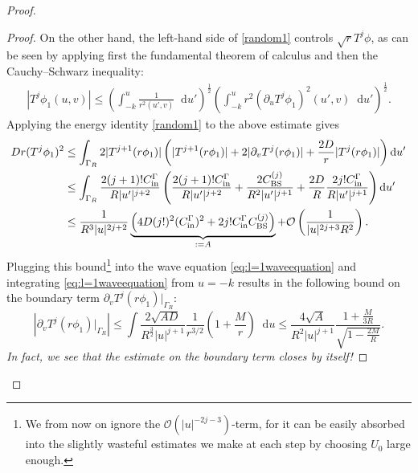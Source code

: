 \documentclass[11pt,english]{article}
\numberwithin{equation}{section}
\theoremstyle{remark}
\theoremstyle{plain}
\theoremstyle{remark}
\newcommand{\dd}{\mathop{}\!\mathrm{d}}
\newcommand{\pu}{\partial_u}
\newcommand{\pv}{\partial_v}
\renewcommand{\(}{\left(}
\renewcommand{\)}{\right)}
\begin{document}
\begin{proof}
\begin{proof}
On the other hand, the left-hand side of \eqref{random1} controls $\sqrt{r}T^j\phi$, as can be seen by applying first the fundamental theorem of calculus and then the Cauchy--Schwarz inequality:
\begin{align*}
\left|T^j\phi_1(u,v)\right|\leq \left(\int_{-k}^u \frac{1}{r^2(u',v)}\dd u'\right)^\frac12\left(\int_{-k}^u r^2\left(\pu T^j\phi_1\right)^2(u',v)\dd u'\right)^\frac12.
\end{align*}
Applying the energy identity \eqref{random1} to the above estimate gives
\begin{align*}
Dr(T^j\phi_1)^2&\leq \int_{\Gamma_R} 2|T^{j+1}(r\phi_1)|\left(|T^{j+1}(r\phi_1)|+2|\pv T^j(r\phi_1)|+\frac{2D}{r} |T^j(r\phi_1)|\right)\dd u'\\
&\leq \int_{\Gamma_R} \frac{2(j+1)!\cin}{R|u'|^{j+2}}\left( \frac{2(j+1)!\cin}{R|u'|^{j+2}}+\frac{2\cbs^{(j)}}{R^2|u'|^{j+1}}+\frac{2D}{R}  \frac{2j!\cin}{R|u'|^{j+1}}\right)\dd u'\\
&\leq \frac{1}{R^3|u|^{2j+2}}\underbrace{\left(4D(j!)^2(\cin)^2+2j!\cin\cbs^{(j)}\right)}_{:=A}+\mathcal{O}\left(\frac{1}{|u|^{2j+3}R^2}\right).
\end{align*}
Plugging this bound\footnote{We from now on ignore the $\mathcal{O}(|u|^{-2j-3})$-term, for it can be easily absorbed into the slightly wasteful estimates we make at each step by choosing $U_0$ large enough.} into the wave equation \eqref{eq:l=1waveequation} and integrating \eqref{eq:l=1waveequation} from $u=-k$ results in the following bound on the boundary term $\pv T^j(r\phi_1)|_{\Gamma_R}$:
\begin{equation}\label{proof5.4x}
\left|\pv T^j(r\phi_1)|_{\Gamma_R}\right|\leq \int \frac{2\sqrt{AD}}{R^{\frac32}|u|^{j+1}}\frac{1}{r^{3/2}}\left(1+\frac{M}{r}\right) \dd u\leq \frac{4\sqrt{A}}{R^2|u|^{j+1}}\frac{1+\frac{M}{3R}}{\sqrt{1-\frac{2M}{R}}}.
\end{equation}
\textit{In fact, we see that the estimate on the boundary term closes by itself!}


\end{proof}
\end{proof}
\end{document}
